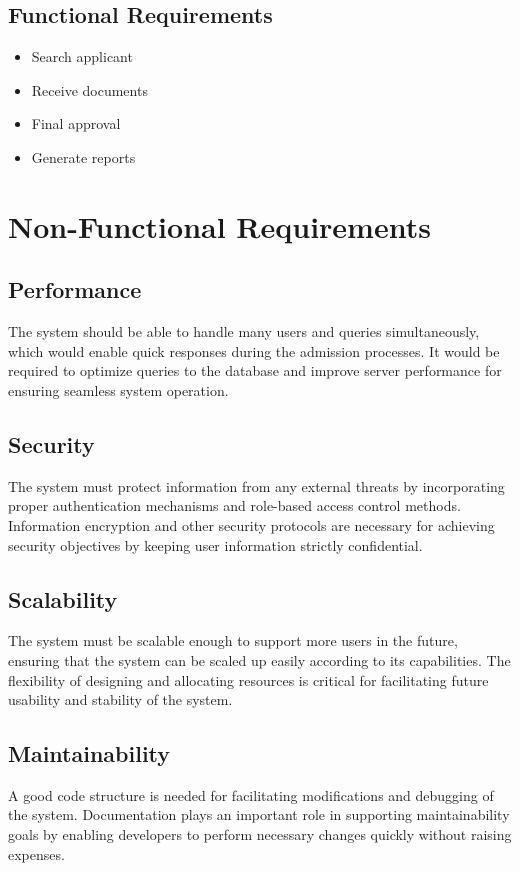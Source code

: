 \subsection{Functional Requirements}

\begin{itemize}
    \item Search applicant
    \item Receive documents
    \item Final approval
    \item Generate reports
\end{itemize}


\section{Non-Functional Requirements}

\subsection{Performance}
The system should be able to handle many users and queries simultaneously, which would enable quick responses during the admission processes. It would be required to optimize queries to the database and improve server performance for ensuring seamless system operation.

\subsection{Security}
The system must protect information from any external threats by incorporating proper authentication mechanisms and role-based access control methods. Information encryption and other security protocols are necessary for achieving security objectives by keeping user information strictly confidential.

\subsection{Scalability}
The system must be scalable enough to support more users in the future, ensuring that the system can be scaled up easily according to its capabilities. The flexibility of designing and allocating resources is critical for facilitating future usability and stability of the system.

\subsection{Maintainability}
A good code structure is needed for facilitating modifications and debugging of the system. Documentation plays an important role in supporting maintainability goals by enabling developers to perform necessary changes quickly without raising expenses. 

